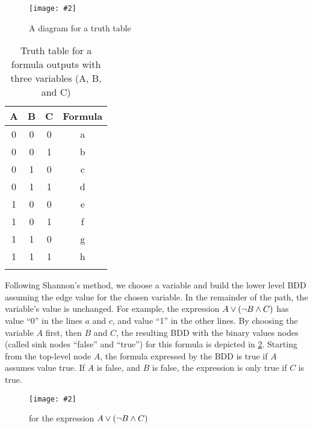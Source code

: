 \documentclass[12pt,openright,twoside,a4paper,oldfontcommands,english,brazil,draft]{abntex2}
\theoremstyle{theo}
\newcommand{\includegraphicsaspectratio}[2][1]{%
  \texttt{[image: \#2]}%
}
\newcommand{\parsin}[1]{\ensuremath\left( #1 \right)}
\begin{document}
\begin{figure}[t]
  \centering
  \includegraphicsaspectratio[0.5]{bdd-diagram-for-a-truth-table}
  \caption{A diagram for a truth table}
  \label{fig:bdd-diagram-for-a-truth-table}
\end{figure}

\begin{table}[t]
  \caption{Truth table for a formula outputs with three variables (A, B, and C)}
  \label{tbl:bdd-truth-table-with-three-variable}
  \centering
  {\footnotesize
  \begin{tabular}{cccc}
    \hline\noalign{\smallskip}
    \textbf{A} & \textbf{B} & \textbf{C} & \textbf{Formula}\\
    \hline\noalign{\smallskip}\hline\noalign{\smallskip}
    0 & 0 & 0 & a \\
    0 & 0 & 1 & b \\
    0 & 1 & 0 & c \\
    0 & 1 & 1 & d \\
    1 & 0 & 0 & e \\
    1 & 0 & 1 & f \\
    1 & 1 & 0 & g \\
    1 & 1 & 1 & h \\
    \hline\noalign{\smallskip}
  \end{tabular}
  }
\end{table}

Following Shannon's method, we choose a variable and build the lower level \ac{BDD} assuming the edge value for the chosen variable.
In the remainder of the path, the variable's value is unchanged.
For example, the expression $A \lor \parsin{\lnot B \land C}$ has value ``0'' in the lines $a$ and $c$, and value ``1'' in the other lines.
By choosing the variable $A$ first, then $B$ and $C$, the resulting \ac{BDD} with the binary values nodes (called sink nodes ``false'' and ``true'') for this formula is depicted in \cref{fig:bdd-diagram-for-example-expression}.
Starting from the top-level node $A$, the formula expressed by the \ac{BDD} is true if $A$ assumes value true.
If $A$ is false, and $B$ is false, the expression is only true if $C$ is true.

\begin{figure}[t]
  \centering
  \includegraphicsaspectratio[0.25]{bdd-diagram-for-example-expression}
  \caption{ for the expression $A \lor \parsin{\lnot B \land C}$}
  \label{fig:bdd-diagram-for-example-expression}
\end{figure}
\end{document}
